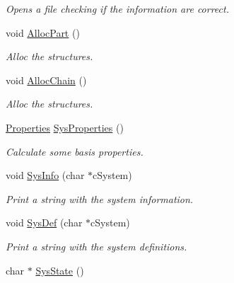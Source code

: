 \begin{DoxyCompactItemize}
\begin{DoxyCompactList}\small\item\em \-Opens a file checking if the information are correct. \end{DoxyCompactList}\item 
\hypertarget{classVarData_a1a9b1fc0b7f08d25f507becdb57d531e}{void \hyperlink{classVarData_a1a9b1fc0b7f08d25f507becdb57d531e}{\-Alloc\-Part} ()}\label{classVarData_a1a9b1fc0b7f08d25f507becdb57d531e}

\begin{DoxyCompactList}\small\item\em \-Alloc the structures. \end{DoxyCompactList}\item 
\hypertarget{classVarData_ab725e5f5e1306bb770cffc9171abbf95}{void \hyperlink{classVarData_ab725e5f5e1306bb770cffc9171abbf95}{\-Alloc\-Chain} ()}\label{classVarData_ab725e5f5e1306bb770cffc9171abbf95}

\begin{DoxyCompactList}\small\item\em \-Alloc the structures. \end{DoxyCompactList}\item 
\hypertarget{classVarData_a5440abb543ae3c83d1b628b0ba0eb3c6}{\hyperlink{classProperties}{\-Properties} \hyperlink{classVarData_a5440abb543ae3c83d1b628b0ba0eb3c6}{\-Sys\-Properties} ()}\label{classVarData_a5440abb543ae3c83d1b628b0ba0eb3c6}

\begin{DoxyCompactList}\small\item\em \-Calculate some basis properties. \end{DoxyCompactList}\item 
\hypertarget{classVarData_a4dd85f1789027793b97a591acc9caf30}{void \hyperlink{classVarData_a4dd85f1789027793b97a591acc9caf30}{\-Sys\-Info} (char $\ast$c\-System)}\label{classVarData_a4dd85f1789027793b97a591acc9caf30}

\begin{DoxyCompactList}\small\item\em \-Print a string with the system information. \end{DoxyCompactList}\item 
\hypertarget{classVarData_aa415b42b89dfba2ab8189be4e86b41ad}{void \hyperlink{classVarData_aa415b42b89dfba2ab8189be4e86b41ad}{\-Sys\-Def} (char $\ast$c\-System)}\label{classVarData_aa415b42b89dfba2ab8189be4e86b41ad}

\begin{DoxyCompactList}\small\item\em \-Print a string with the system definitions. \end{DoxyCompactList}\item 
\hypertarget{classVarData_a497026b20d4baf7d7812310a50a73154}{char $\ast$ \hyperlink{classVarData_a497026b20d4baf7d7812310a50a73154}{\-Sys\-State} ()}\label{classVarData_a497026b20d4baf7d7812310a50a73154}


\end{DoxyCompactItemize}
